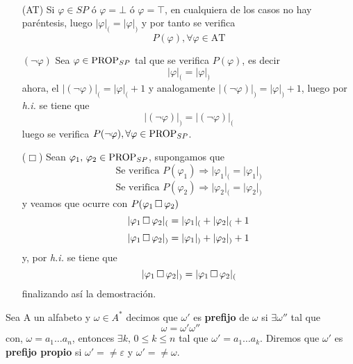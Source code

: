 \paragraph{}
\begin{itemize}
	\item[(AT)] Si $\varphi \in SP$ ó $\varphi=\bot$ ó $\varphi=\top$, en cualquiera de los casos no hay paréntesis, luego $\vert \varphi \vert_{(}=\vert \varphi \vert_{)}$ y por tanto se verifica
	\[ P(\varphi), \forall \varphi \in \mbox{AT} \]
	\item[$(\lnot \varphi)$] Sea $\varphi \in \mbox{PROP}_{SP}$ tal que se verifica $P(\varphi)$, es decir 
	\[ \vert \varphi \vert_{(}=\vert \varphi \vert_{)} \]
	ahora, el $\vert (\lnot \varphi) \vert_{(}= \vert \varphi \vert_{(} +1$ y analogamente $\vert (\lnot \varphi) \vert_{)}= \vert \varphi \vert_{)} +1$, luego por \textit{h.i.} se tiene que 
	\[ \vert (\lnot \varphi) \vert_{)}=\vert (\lnot \varphi) \vert_{(}  \]  
	luego se verifica $P(\lnot \varphi), \forall \varphi \in \mbox{PROP}_{SP}$.
	\item[($\Box$)] Sean $\varphi_1, \, \varphi_2 \in \mbox{PROP}_{SP}$, supongamos que
	\[ \mbox{Se verifica } P(\varphi_1) \Rightarrow \vert \varphi_1 \vert_{(}=\vert \varphi_1 \vert_{)}  \]
	\[ \mbox{Se verifica } P(\varphi_2) \Rightarrow \vert \varphi_2 \vert_{(}=\vert \varphi_2 \vert_{)}  \]  
	y veamos que ocurre con $P(\varphi_1 \, \Box \, \varphi_2)$ 
	\[ \vert \varphi_1 \, \Box \, \varphi_2 \vert_{(}= \vert \varphi_1 \vert_{(} + \vert \varphi_2 \vert_{(} +1  \]
	\[ \vert \varphi_1 \, \Box \, \varphi_2 \vert_{)}= \vert \varphi_1 \vert_{)} + \vert \varphi_2 \vert_{)} +1  \]
	y, por \textit{h.i.} se tiene que  
	\[ \vert \varphi_1 \, \Box \, \varphi_2 \vert_{)}= \vert \varphi_1 \, \Box \, \varphi_2 \vert_{(} \]
	finalizando así la demostración.
\end{itemize}

\begin{definition} Sea A un alfabeto y $\omega \in A^*$ decimos que $\omega'$ es \textbf{prefijo} de $\omega$ si $\exists \omega''$ tal que 
\[ \omega=\omega' \omega'' \]
con, $\omega=a_1 \ldots a_n$, entonces $\exists k, \, 0\leq k \leq n$ tal que $\omega'=a_1 \ldots a_k$. Diremos que $\omega'$ es \textbf{prefijo propio} si $\omega'=\neq \varepsilon$ y $\omega'=\neq \omega$. 
\end{definition}

